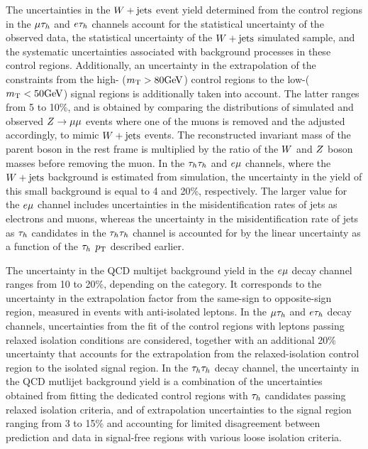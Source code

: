 The uncertainties in the $W+ \text{jets}$ event yield determined from the control regions in the $\mu\tau_{h}$ and 
$e\tau_{h}$ channels account for the statistical uncertainty of the observed data, the statistical uncertainty of the 
$W+ \text{jets}$ simulated sample, and the systematic uncertainties associated with background processes in these 
control regions. Additionally, an uncertainty in the extrapolation  of the constraints from the high-\MT 
($m_\mathrm{T}>80\mathrm{GeV}$) control regions to the low-\MT ($m_\mathrm{T}<50\mathrm{GeV}$) signal regions is additionally taken into account. 
The latter ranges from 5 to 10\%, and is obtained by comparing the \MT distributions of simulated and observed 
$Z\to\mu\mu$ events where one of the muons is removed and the \etvecmiss adjusted accordingly, to mimic 
$W+\text{jets}$ events. The reconstructed invariant mass of the parent boson in the rest frame is multiplied by the 
ratio of the $W$ and $Z$ boson masses before removing the muon.
In the $\tau_{h}\tau_{h}$ and $e\mu$ channels, where the $W+\text{jets}$ background is estimated from simulation, the 
uncertainty in the yield of this small background is equal to 4 and 20\%, respectively. The larger value for the 
$e\mu$ channel includes uncertainties in the misidentification rates of jets as electrons and muons, whereas the 
uncertainty in the misidentification rate of jets as $\tau_{h}$ candidates in the $\tau_{h}\tau_{h}$ channel is accounted for 
by the linear uncertainty as a function of the $\tau_{h}$ $p_\mathrm{T}$ described earlier.

The uncertainty in the QCD multijet background yield in the $e\mu$ decay channel ranges from 10 to 20\%, depending 
on the category. It corresponds to the uncertainty in the extrapolation factor from the same-sign to opposite-sign 
region, measured in events with anti-isolated leptons. In the $\mu\tau_{h}$ and $e\tau_{h}$ decay channels, uncertainties from 
the fit of the control regions with leptons passing relaxed isolation conditions are
considered, together with an additional 20\% uncertainty that accounts for the extrapolation from the relaxed-isolation 
control region to the isolated signal region.
In the $\tau_{h}\tau_{h}$ decay channel, the uncertainty in the QCD mutlijet background yield is a combination of the 
uncertainties obtained from fitting the dedicated control regions with $\tau_{h}$ candidates passing relaxed isolation 
criteria, and of extrapolation uncertainties to the signal region ranging from 3 to 15\% and accounting for limited 
disagreement between prediction and data in signal-free regions with various loose isolation criteria.

